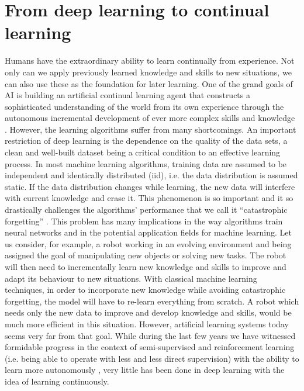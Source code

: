 \documentclass[english, LaM, oneside]{sapthesis}%
\begin{document}
\section{From deep learning to continual learning}
Humans have the extraordinary ability to learn continually from experience. Not only can we apply previously learned knowledge and skills to new situations, we can also use these as the foundation for later learning. One of the grand goals of AI is building an artificial continual learning agent that constructs a sophisticated understanding of the world from its own experience through the autonomous incremental development of ever more complex skills and knowledge \cite{ring}.
\newline \newline
However, the learning algorithms suffer from many shortcomings. An important restriction of deep learning is the dependence on the quality of the data sets, a clean and well-built dataset being a critical condition to an effective learning process. In most machine learning algorithms, training data are assumed to be independent and identically distributed (iid), i.e. the data distribution is assumed static. If the data distribution changes while learning, the new data will interfere with current knowledge and erase it. This phenomenon is so important and it so drastically challenges the algorithms’ performance that we call it “catastrophic forgetting” \cite{cat_forgetting}. This problem has many implications in the way algorithms train neural networks and in the potential application fields for machine learning.
Let us consider, for example, a robot working in an evolving environment and being assigned the goal of manipulating new objects or solving new tasks. The robot will then need to incrementally learn new knowledge and skills to improve and adapt its behaviour to new situations. With classical machine learning techniques, in order to incorporate new knowledge while avoiding catastrophic forgetting, the model will have to re-learn everything from scratch. A robot which needs only the new data to improve and develop knowledge and skills, would be much more efficient in this situation.
\newline \newline
However, artificial learning systems today seems very far from that goal. While during the last few years we have witnessed formidable progress in the context of semi-supervised and reinforcement learning (i.e. being able to operate with less and less direct supervision) with the ability to learn more autonomously \cite{goodfellow, lecun,mnih}, very little has been done in deep learning with the idea of learning continuously.
\end{document}
